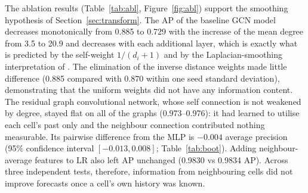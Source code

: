 \documentclass[11pt,a4paper]{report}
\begin{document}
The ablation results (Table~\ref{tab:abl}, Figure~\ref{fig:abl}) support the smoothing hypothesis of Section~\ref{sec:transform}. The AP of the baseline GCN model decreases monotonically from 0.885 to 0.729 with the increase of the mean degree from 3.5 to 20.9 and decreases with each additional layer, which is exactly what is predicted by the self-weight $1/(d_i+1)$ and by the Laplacian-smoothing interpretation of \citet{li2018}. The elimination of the inverse distance weights made little difference (0.885 compared with 0.870 within one seed standard deviation), demonstrating that the uniform weights did not have any information content. The residual graph convolutional network, whose self connection is not weakened by degree, stayed flat on all of the graphs (0.973--0.976): it had learned to utilise each cell's past only and the neighbour connection contributed nothing measurable. Its pairwise difference from the MLP is $-0.004$ average precision (95\% confidence interval $[-0.013, 0.008]$; Table~\ref{tab:boot}). Adding neighbour-average features to LR also left AP unchanged (0.9830 vs 0.9834 AP). Across three independent tests, therefore, information from neighbouring cells did not improve forecasts once a cell's own history was known.
\end{document}
